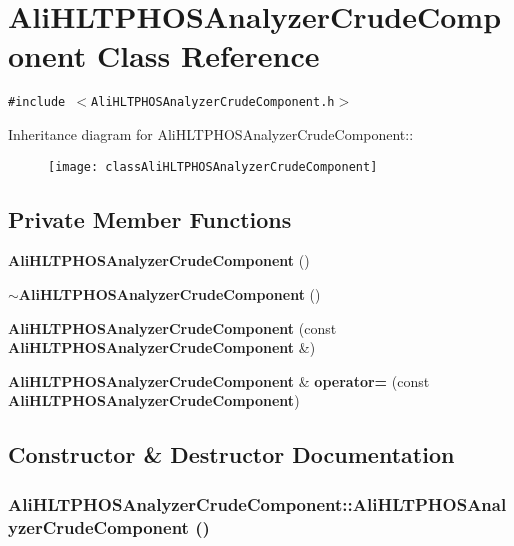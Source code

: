 \section{Ali\-HLTPHOSAnalyzer\-Crude\-Component Class Reference}
\label{classAliHLTPHOSAnalyzerCrudeComponent}
{\tt \#include $<$Ali\-HLTPHOSAnalyzer\-Crude\-Component.h$>$}

Inheritance diagram for Ali\-HLTPHOSAnalyzer\-Crude\-Component::\begin{figure}[H]
\begin{center}
\leavevmode
\texttt{[image: classAliHLTPHOSAnalyzerCrudeComponent]}
\end{center}
\end{figure}
\subsection*{Private Member Functions}
\begin{CompactItemize}
\item 
{\bf Ali\-HLTPHOSAnalyzer\-Crude\-Component} ()
\item 
{\bf $\sim$Ali\-HLTPHOSAnalyzer\-Crude\-Component} ()
\item 
{\bf Ali\-HLTPHOSAnalyzer\-Crude\-Component} (const {\bf Ali\-HLTPHOSAnalyzer\-Crude\-Component} \&)
\item 
{\bf Ali\-HLTPHOSAnalyzer\-Crude\-Component} \& {\bf operator=} (const {\bf Ali\-HLTPHOSAnalyzer\-Crude\-Component})
\end{CompactItemize}


\subsection{Constructor \& Destructor Documentation}
\subsubsection{\setlength{\rightskip}{0pt plus 5cm}Ali\-HLTPHOSAnalyzer\-Crude\-Component::Ali\-HLTPHOSAnalyzer\-Crude\-Component ()\hspace{0.3cm}{\tt  [private]}}\label{classAliHLTPHOSAnalyzerCrudeComponent_d0}


